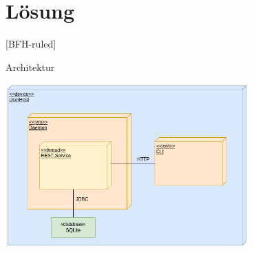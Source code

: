 \documentclass[
    ngerman,%
    authorontitle=true,
]{bfhbeamer}
\begin{document}
    \section{Lösung}\label{sec:loesung}
    [BFH-ruled]
    \frame{\sectionpage}

    \begin{frame}{Architektur}
        \begin{center}
            \includegraphics[width=0.7\textwidth]{assets/DeplDiagram} %
        \end{center}
    \end{frame}
\end{document}
